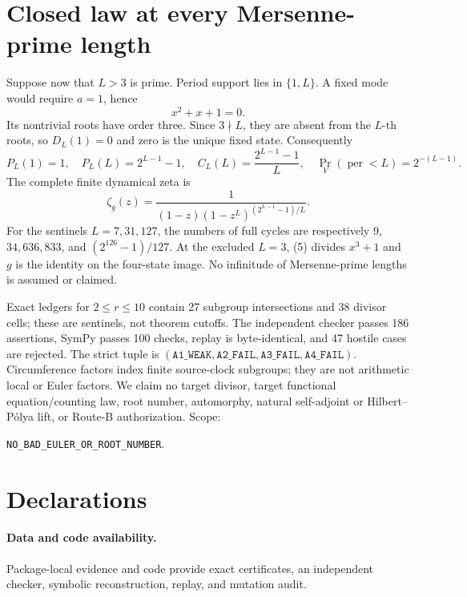 \documentclass[10pt]{article}
\begin{document}
\section{Closed law at every Mersenne-prime length}
Suppose now that $L>3$ is prime.  Period support lies in $\{1,L\}$.  A fixed
mode would require $a=1$, hence
\[
x^2+x+1=0.                                                     \tag{5}
\]
Its nontrivial roots have order three.  Since $3\nmid L$, they are absent
from the $L$-th roots, so $D_L(1)=0$ and zero is the unique fixed state.
Consequently
\begin{equation}
P_L(1)=1,\quad P_L(L)=2^{L-1}-1,\quad
C_L(L)=\frac{2^{L-1}-1}{L},\quad
\Pr_V(\operatorname{per}<L)=2^{-(L-1)}.                       \tag{6}
\end{equation}
The complete finite dynamical zeta is
\begin{equation}
\zeta_g(z)=\frac1{(1-z)(1-z^L)^{(2^{L-1}-1)/L}}.              \tag{7}
\end{equation}
For the sentinels $L=7,31,127$, the numbers of full cycles are respectively
$9$, $34{,}636{,}833$, and $(2^{126}-1)/127$.
At the excluded $L=3$, (5) divides $x^3+1$ and $g$ is the identity on the
four-state image.  No infinitude of Mersenne-prime lengths is assumed or
claimed.

Exact ledgers for $2\leq r\leq10$ contain 27 subgroup intersections and 38
divisor cells; these are sentinels, not theorem cutoffs.  The independent
checker passes 186 assertions, SymPy passes 100 checks, replay is
byte-identical, and 47 hostile cases are rejected.  The strict tuple is
$(\texttt{A1\_WEAK},\texttt{A2\_FAIL},\texttt{A3\_FAIL},
\texttt{A4\_FAIL})$.  Circumference factors index finite source-clock
subgroups; they are not arithmetic local or Euler factors.  We claim no
target divisor, target functional equation/counting law, root number,
automorphy, natural self-adjoint or Hilbert--P\'olya lift, or Route-B
authorization.  Scope:
\begin{center}\texttt{NO\_BAD\_EULER\_OR\_ROOT\_NUMBER}.\end{center}

\section*{Declarations}
\paragraph{Data and code availability.}
Package-local evidence and code provide exact certificates, an independent
checker, symbolic reconstruction, replay, and mutation audit.
\end{document}
